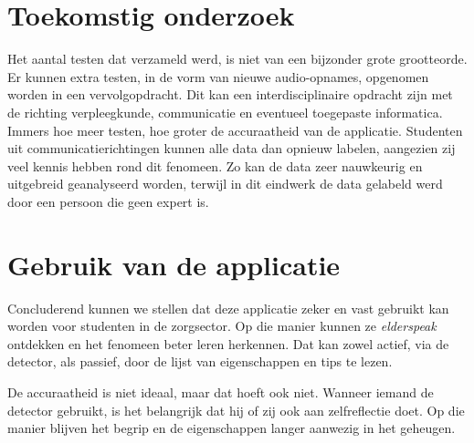 \documentclass[a0,portrait]{a0poster}
\begin{document}
\begin{multicols}{2}
\color{HoGentAccent1}
\section*{Toekomstig onderzoek}
\color{black}

Het aantal testen dat verzameld werd, is niet van een bijzonder grote grootteorde. Er kunnen extra testen, in de vorm van nieuwe audio-opnames, opgenomen worden in een vervolgopdracht. Dit kan een interdisciplinaire opdracht zijn met de richting verpleegkunde, communicatie en eventueel toegepaste informatica. Immers hoe meer testen, hoe groter de accuraatheid van de applicatie. Studenten uit communicatierichtingen kunnen alle data dan opnieuw labelen, aangezien zij veel kennis hebben rond dit fenomeen. Zo kan de data zeer nauwkeurig en uitgebreid geanalyseerd worden, terwijl in dit eindwerk de data gelabeld werd door een persoon die geen expert is.



\color{HoGentAccent1}
\section*{Gebruik van de applicatie}
\color{black}

Concluderend kunnen we stellen dat deze applicatie zeker en vast gebruikt kan worden voor studenten in de zorgsector. Op die manier kunnen ze \textit{elderspeak} ontdekken en het fenomeen beter leren herkennen. Dat kan zowel actief, via de detector, als passief, door de lijst van eigenschappen en tips te lezen.

De accuraatheid is niet ideaal, maar dat hoeft ook niet. Wanneer iemand de detector gebruikt, is het belangrijk dat hij of zij ook aan zelfreflectie doet. Op die manier blijven het begrip en de eigenschappen langer aanwezig in het geheugen.


\end{multicols}
\end{document}
